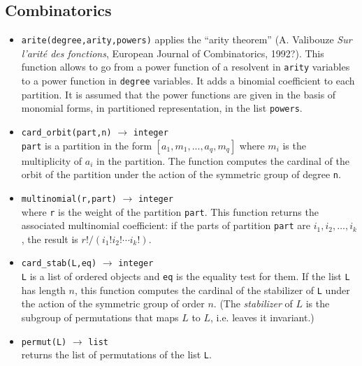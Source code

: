 \documentclass[11pt]{article}
\begin{document}
\subsection{Combinatorics}

\begin{itemize}
  \item \texttt{arite(degree,arity,powers)} 
    applies the ``arity theorem'' (A. Valibouze \textit{Sur l'arit\'e
    des fonctions}, European Journal of Combinatorics, 1992?).  This function
    allows to go from a power function of a resolvent in \texttt{arity} variables
    to a power function in \texttt{degree} variables.  It adds a binomial
    coefficient to each partition.  It is assumed that the power functions are
    given in the basis of monomial forms, in partitioned representation, in the
    list \texttt{powers}.
  \item \texttt{card\_orbit(part,n)} 
    $\longrightarrow$ \texttt{integer} \\
    \texttt{part} is a partition in the form $[a_1,m_1,...,a_q,m_q]$ where
    $m_i$ is the multiplicity of $a_i$ in the partition.  The function computes
    the cardinal of the orbit of the partition under the action of the symmetric
    group of degree \texttt{n}. 
  \item \texttt{multinomial(r,part)} 
    $\longrightarrow$ \texttt{integer} \\
    where \texttt{r} is the weight of the partition \texttt{part}. This function
    returns the associated multinomial coefficient: if the parts of partition
    \texttt{part} are $i_1, i_2, \dots, i_k$, the result is
    $r!/(i_1!i_2! \cdots i_k!)$.
  \item \texttt{card\_stab(L,eq)} 
    $\longrightarrow$ \texttt{integer} \\
    \texttt{L} is a list of ordered objects and \texttt{eq} is the equality test
    for them.  If the list \texttt{L} has length $n$, this function computes the
    cardinal of the stabilizer of \texttt{L} under the action of the symmetric
    group of order $n$.  (The \emph{stabilizer} of $L$ is the subgroup of
    permutations that maps $L$ to $L$, i.e. leaves it invariant.)
 \item \texttt{permut(L)} 
   $\longrightarrow$ \texttt{list} \\
   returns the list of permutations of the list \texttt{L}.
\end{itemize}
\end{document}
